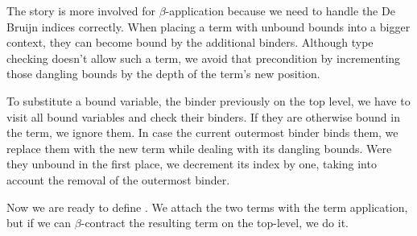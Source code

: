 
The story is more involved for \(\beta\)-application \isa{(\isasymbullet)} because we need to handle the De Bruijn indices correctly.
When placing a term with unbound bounds into a bigger context, they can become bound by the additional binders.
Although type checking doesn't allow such a term, we avoid that precondition by incrementing those dangling bounds by the depth of the term's new position.


To substitute a bound variable, the binder previously on the top level, we have to visit all bound variables and check their binders.
If they are otherwise bound in the term, we ignore them.
In case the current outermost binder binds them, we replace them with the new term while dealing with its dangling bounds.
Were they unbound in the first place, we decrement its index by one, taking into account the removal of the outermost binder.


Now we are ready to define \isa{(\isasymbullet)}.
We attach the two terms with the term application, but if we can \(\beta\)-contract the resulting term on the top-level, we do it.

